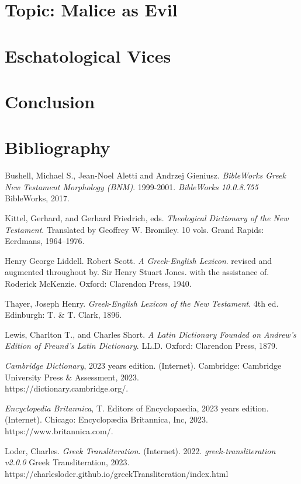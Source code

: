 \documentclass[a4paper,twocolumn,twoside,notitlepage,10pt]{article}
\begin{document}
\section{Topic: Malice as Evil}
\section{Eschatological Vices}

\section{Conclusion}

\section{Bibliography}
\begin{description}
	\item Bushell, Michael S., Jean-Noel Aletti and Andrzej Gieniusz. \emph{BibleWorks Greek New Testament Morphology (BNM)}. 1999-2001. \emph{BibleWorks 10.0.8.755} BibleWorks, 2017.
	\item Kittel, Gerhard, and Gerhard Friedrich, eds. \emph{Theological Dictionary of the New Testament}. Translated by Geoffrey W. Bromiley. 10 vols. Grand Rapids: Eerdmans, 1964--1976.
	\item Henry George Liddell. Robert Scott.  \emph{A Greek-English Lexicon}. revised and augmented throughout by. Sir Henry Stuart Jones. with the assistance of. Roderick McKenzie. Oxford: Clarendon Press, 1940.
	\item Thayer, Joseph Henry. \emph{Greek-English Lexicon of the New Testament}. 4th ed. Edinburgh: T. \& T. Clark, 1896.
	\item Lewis, Charlton T., and Charles Short. \emph{A Latin Dictionary Founded on Andrew's Edition of Freund's Latin Dictionary}. LL.D. Oxford: Clarendon Press, 1879.
	\item \emph{Cambridge Dictionary}, 2023 years edition. (Internet). Cambridge: Cambridge University Press \& Assessment, 2023.\\ https://dictionary.cambridge.org/.
	\item \emph{Encyclopedia Britannica}, T. Editors of Encyclopaedia, 2023 years edition. (Internet). Chicago: Encyclopædia Britannica, Inc, 2023.\\https://www.britannica.com/.
	\item Loder, Charles. \emph{Greek Transliteration}. (Internet). 2022. \emph{greek-transliteration v2.0.0} Greek Transliteration, 2023.\\https://charlesloder.github.io/greekTransliteration/index.html
\end{description}
\end{document}
